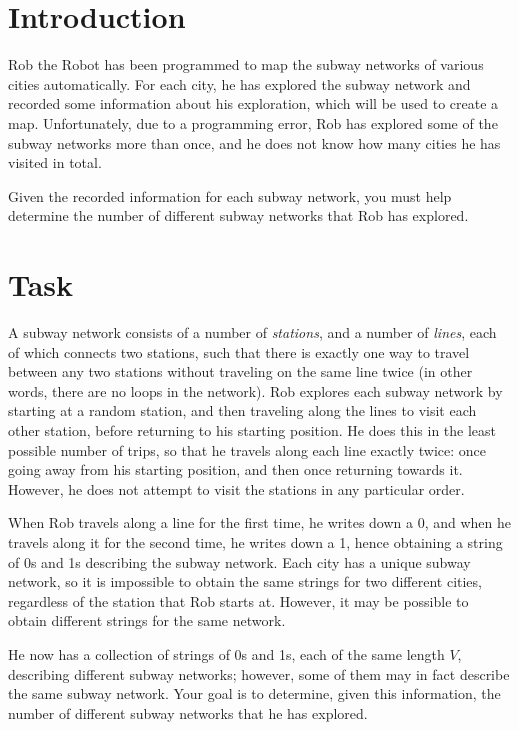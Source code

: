 \documentclass{saco}
\begin{document}
\maketitle

\section{Introduction}
Rob the Robot has been programmed to map the subway networks of various cities automatically.
For each city, he has explored the subway network and recorded some information about his exploration, which will be used to create a map.
Unfortunately, due to a programming error, Rob has explored some of the subway networks more than once, and he does not know how many cities he has visited in total.

Given the recorded information for each subway network, you must help determine the number of different subway networks that Rob has explored.

\section{Task}
A subway network consists of a number of \emph{stations}, and a number of \emph{lines}, each of which connects two stations, such that there is exactly one way to travel between any two stations without traveling on the same line twice (in other words, there are no loops in the network).
Rob explores each subway network by starting at a random station, and then traveling along the lines to visit each other station, before returning to his starting position.
He does this in the least possible number of trips, so that he travels along each line exactly twice: once going away from his starting position, and then once returning towards it.
However, he does not attempt to visit the stations in any particular order.

When Rob travels along a line for the first time, he writes down a 0, and when he travels along it for the second time, he writes down a 1, hence obtaining a string of 0s and 1s describing the subway network.
Each city has a unique subway network, so it is impossible to obtain the same strings for two different cities, regardless of the station that Rob starts at.
However, it may be possible to obtain different strings for the same network.

He now has a collection of strings of 0s and 1s, each of the same length $V$, describing different subway networks; however, some of them may in fact describe the same subway network.
Your goal is to determine, given this information, the number of different subway networks that he has explored.
\end{document}
